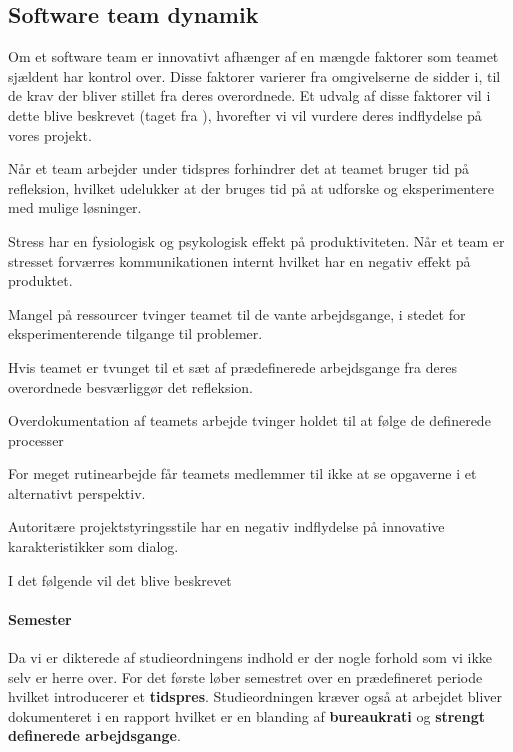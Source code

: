 \subsection{Software team dynamik}
Om et software team er innovativt afhænger af en mængde faktorer som teamet sjældent har kontrol over.
Disse faktorer varierer fra omgivelserne de sidder i, til de krav der bliver stillet fra deres overordnede.
Et udvalg af disse faktorer vil i dette blive beskrevet (taget fra \citet[s.~81-82]{book:softwareinnovation}), hvorefter vi vil vurdere deres indflydelse på vores projekt.

\begin{description}[style=nextline]
	\item[Tidspres] Når et team arbejder under tidspres forhindrer det at teamet bruger tid på refleksion, hvilket udelukker at der bruges tid på at udforske og eksperimentere med mulige løsninger.
	\item[Stress] Stress har en fysiologisk og psykologisk effekt på produktiviteten. Når et team er stresset forværres kommunikationen internt hvilket har en negativ effekt på produktet.
	\item[Ressource mangel] Mangel på ressourcer tvinger teamet til de vante arbejdsgange, i stedet for eksperimenterende tilgange til problemer.
	\item[Strengt definerede arbejdsgange] Hvis teamet er tvunget til et sæt af prædefinerede arbejdsgange fra deres overordnede besværliggør det refleksion.
	\item[Bureaukrati] Overdokumentation af teamets arbejde tvinger holdet til at følge de definerede processer 
	\item[Rutinearbejde] For meget rutinearbejde får teamets medlemmer til ikke at se opgaverne i et alternativt perspektiv.
	\item[Dårlig projektstyring] Autoritære projektstyringsstile har en negativ indflydelse på innovative karakteristikker som dialog.
\end{description}

I det følgende vil det blive beskrevet 

\paragraph{Semester}
Da vi er dikterede af studieordningens indhold er der nogle forhold som vi ikke selv er herre over.
For det første løber semestret over en prædefineret periode hvilket introducerer et \textbf{tidspres}.
Studieordningen kræver også at arbejdet bliver dokumenteret i en rapport hvilket er en blanding af \textbf{bureaukrati} og \textbf{strengt definerede arbejdsgange}.

